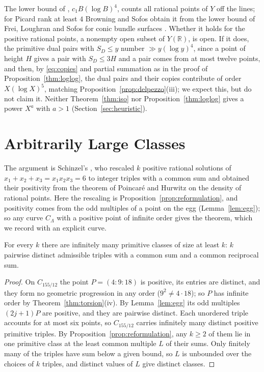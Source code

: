 \documentclass[10pt]{article}
\newcommand{\R}{\mathbb{R}}
\begin{document}
The lower bound of \cite[Theorem~1.1]{browningsofos2019}, $c_1B(\log B)^4$, counts all rational points of $Y$ off the lines; for Picard rank at least $4$ Browning and Sofos obtain it from the lower bound of Frei, Loughran and Sofos for conic bundle surfaces \cite[\S3]{browningsofos2019}. Whether it holds for the positive rational points, a nonempty open subset of $Y(\R)$, is open. If it does, the primitive dual pairs with $S_D\le y$ number $\gg y(\log y)^4$, since a point of height $H$ gives a pair with $S_D\le3H$ and a pair comes from at most twelve points, and then, by \eqref{eq:copies} and partial summation as in the proof of Proposition~\ref{thm:loglog}, the dual pairs and their copies contribute of order $X(\log X)^5$, matching Proposition~\ref{prop:delpezzo}(iii); we expect this, but do not claim it. Neither Theorem~\ref{thm:iso} nor Proposition~\ref{thm:loglog} gives a power $X^a$ with $a>1$ (Section~\ref{sec:heuristic}).

\section{Arbitrarily Large Classes}\label{sec:fibres}

The argument is Schinzel's \cite[pp.~587--588]{schinzel1996}, who rescaled $k$ positive rational solutions of $x_1+x_2+x_3=x_1x_2x_3=6$ to integer triples with a common sum and obtained their positivity from the theorem of Poincar\'e and Hurwitz on the density of rational points. Here the rescaling is Proposition~\ref{prop:reformulation}, and positivity comes from the odd multiples of a point on the egg \cite[p.~119]{bgn1993} (Lemma~\ref{lem:egg}); so any curve $C_\Lambda$ with a positive point of infinite order gives the theorem, which we record with an explicit curve.

\begin{theorem}\label{thm:largefibres}
For every $k$ there are infinitely many primitive classes of size at least $k$: $k$ pairwise distinct admissible triples with a common sum and a common reciprocal sum.
\end{theorem}

\begin{proof}
On $C_{155/12}$ the point $P=(4:9:18)$ is positive, its entries are distinct, and they form no geometric progression in any order ($9^2\ne4\cdot18$); so $P$ has infinite order by Theorem~\ref{thm:torsion}(iv). By Lemma~\ref{lem:egg} its odd multiples $(2j+1)P$ are positive, and they are pairwise distinct. Each unordered triple accounts for at most six points, so $C_{155/12}$ carries infinitely many distinct positive primitive triples. By Proposition~\ref{prop:reformulation}, any $k\ge2$ of them lie in one primitive class at the least common multiple $L$ of their sums. Only finitely many of the triples have sum below a given bound, so $L$ is unbounded over the choices of $k$ triples, and distinct values of $L$ give distinct classes.
\end{proof}
\end{document}
